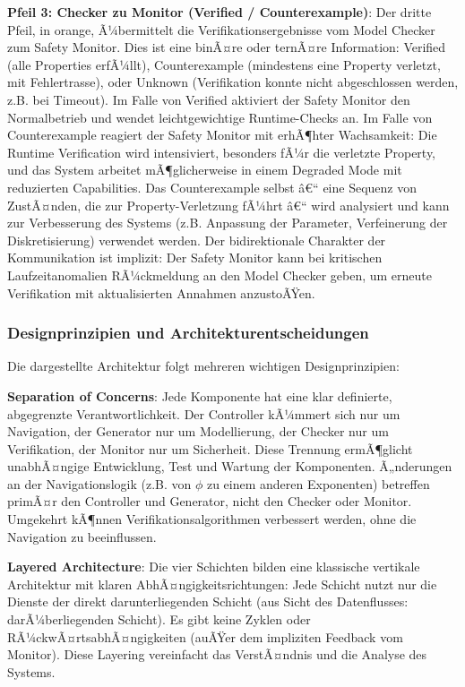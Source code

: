 ﻿\documentclass[a4paper,12pt]{article}
\theoremstyle{definition}
\begin{document}
\textbf{Pfeil 3: Checker zu Monitor (Verified / Counterexample)}: Der dritte Pfeil, in orange, Ã¼bermittelt die Verifikationsergebnisse vom Model Checker zum Safety Monitor. Dies ist eine binÃ¤re oder ternÃ¤re Information: Verified (alle Properties erfÃ¼llt), Counterexample (mindestens eine Property verletzt, mit Fehlertrasse), oder Unknown (Verifikation konnte nicht abgeschlossen werden, z.B. bei Timeout). Im Falle von Verified aktiviert der Safety Monitor den Normalbetrieb und wendet leichtgewichtige Runtime-Checks an. Im Falle von Counterexample reagiert der Safety Monitor mit erhÃ¶hter Wachsamkeit: Die Runtime Verification wird intensiviert, besonders fÃ¼r die verletzte Property, und das System arbeitet mÃ¶glicherweise in einem Degraded Mode mit reduzierten Capabilities. Das Counterexample selbst â€“ eine Sequenz von ZustÃ¤nden, die zur Property-Verletzung fÃ¼hrt â€“ wird analysiert und kann zur Verbesserung des Systems (z.B. Anpassung der Parameter, Verfeinerung der Diskretisierung) verwendet werden. Der bidirektionale Charakter der Kommunikation ist implizit: Der Safety Monitor kann bei kritischen Laufzeitanomalien RÃ¼ckmeldung an den Model Checker geben, um erneute Verifikation mit aktualisierten Annahmen anzustoÃŸen.

\subsubsection{Designprinzipien und Architekturentscheidungen}

Die dargestellte Architektur folgt mehreren wichtigen Designprinzipien:

\textbf{Separation of Concerns}: Jede Komponente hat eine klar definierte, abgegrenzte Verantwortlichkeit. Der Controller kÃ¼mmert sich nur um Navigation, der Generator nur um Modellierung, der Checker nur um Verifikation, der Monitor nur um Sicherheit. Diese Trennung ermÃ¶glicht unabhÃ¤ngige Entwicklung, Test und Wartung der Komponenten. Ã„nderungen an der Navigationslogik (z.B. von $\phi$ zu einem anderen Exponenten) betreffen primÃ¤r den Controller und Generator, nicht den Checker oder Monitor. Umgekehrt kÃ¶nnen Verifikationsalgorithmen verbessert werden, ohne die Navigation zu beeinflussen.

\textbf{Layered Architecture}: Die vier Schichten bilden eine klassische vertikale Architektur mit klaren AbhÃ¤ngigkeitsrichtungen: Jede Schicht nutzt nur die Dienste der direkt darunterliegenden Schicht (aus Sicht des Datenflusses: darÃ¼berliegenden Schicht). Es gibt keine Zyklen oder RÃ¼ckwÃ¤rtsabhÃ¤ngigkeiten (auÃŸer dem impliziten Feedback vom Monitor). Diese Layering vereinfacht das VerstÃ¤ndnis und die Analyse des Systems.
\end{document}
